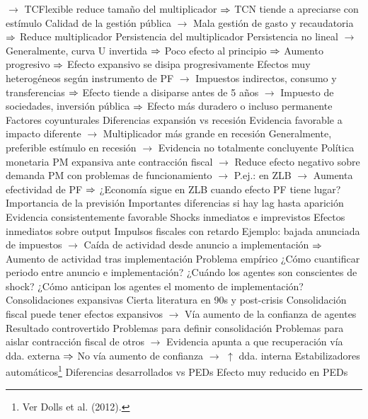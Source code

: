 \documentclass{nuevotema}
\begin{document}
\begin{esquemal}
				\4[] $\to$ TCFlexible reduce tamaño del multiplicador
				\4[] $\Rightarrow$ TCN tiende a apreciarse con estímulo
				\4[] Calidad de la gestión pública
				\4[] $\to$ Mala gestión de gasto y recaudatoria
				\4[] $\Rightarrow$ Reduce multiplicador
				\4 Persistencia del multiplicador
				\4[] Persistencia no lineal
				\4[] $\to$ Generalmente, curva U invertida
				\4[] $\Rightarrow$ Poco efecto al principio
				\4[] $\Rightarrow$ Aumento progresivo
				\4[] $\Rightarrow$ Efecto expansivo se disipa progresivamente
				\4[] Efectos muy heterogéneos según instrumento de PF
				\4[] $\to$ Impuestos indirectos, consumo y transferencias
				\4[] $\Rightarrow$ Efecto tiende a disiparse antes de 5 años
				\4[] $\to$ Impuesto de sociedades, inversión pública
				\4[] $\Rightarrow$ Efecto más duradero o incluso permanente
			\3 Factores coyunturales
				\4 Diferencias expansión vs recesión
				\4[] Evidencia favorable a impacto diferente
				\4[] $\to$ Multiplicador más grande en recesión
				\4[] Generalmente, preferible estímulo en recesión
				\4[] $\to$ Evidencia no totalmente concluyente
				\4 Política monetaria
				\4[] PM expansiva ante contracción fiscal
				\4[] $\to$ Reduce efecto negativo sobre demanda
				\4[] PM con problemas de funcionamiento
				\4[] $\to$ P.ej.: en ZLB
				\4[] $\to$ Aumenta efectividad de PF
				\4[] $\Rightarrow$ ¿Economía sigue en ZLB cuando efecto PF tiene lugar?
			\3 Importancia de la previsión
				\4 Importantes diferencias si hay lag hasta aparición
				\4[] Evidencia consistentemente favorable
				\4 Shocks inmediatos e imprevistos
				\4[] Efectos inmediatos sobre output
				\4 Impulsos fiscales con retardo
				\4[] Ejemplo: bajada anunciada de impuestos
				\4[] $\to$ Caída de actividad desde anuncio a implementación
				\4[] $\Rightarrow$ Aumento de actividad tras implementación
				\4 Problema empírico
				\4[] ¿Cómo cuantificar periodo entre anuncio e implementación?
				\4[] ¿Cuándo los agentes son conscientes de shock?
				\4[] ¿Cómo anticipan los agentes el momento de implementación?
			\3 Consolidaciones expansivas
				\4 Cierta literatura en 90s y post-crisis
				\4[] Consolidación fiscal puede tener efectos expansivos
				\4[] $\to$ Vía aumento de la confianza de agentes
				\4 Resultado controvertido
				\4[] Problemas para definir consolidación
				\4[] Problemas para aislar contracción fiscal de otros
				\4[] $\to$ Evidencia apunta a que recuperación vía dda. externa
				\4[] $\Rightarrow$ No vía aumento de confianza $\to$ $\uparrow$ dda. interna
			\3 Estabilizadores automáticos\footnote{Ver Dolls et al. (2012).}
				\4 Diferencias desarrollados vs PEDs
				\4[] Efecto muy reducido en PEDs

\end{esquemal}
\end{document}
